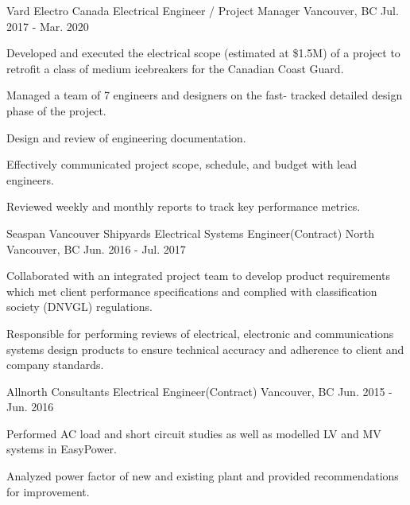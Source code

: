 \begin{cventries}
    \cventry
    {Vard Electro Canada} %
    {Electrical Engineer / Project Manager} %
    {Vancouver, BC} %
    {Jul. 2017 - Mar. 2020} %
    { %
        \begin{cvitems}
            \item {Developed and executed the electrical scope (estimated at \$1.5M) of a project to retrofit a class of medium icebreakers for the Canadian Coast Guard.}
            \item {Managed a team of 7 engineers and designers on the fast- tracked detailed design phase of the project.}
            \item {Design and review of engineering documentation.}
            \item {Effectively communicated project scope, schedule, and budget with lead engineers.}
            \item {Reviewed weekly and monthly reports to track key performance metrics.}
        \end{cvitems}
    }

    \cventry
    {Seaspan Vancouver Shipyards} %
    {Electrical Systems Engineer(Contract)} %
    {North Vancouver, BC} %
    {Jun. 2016 - Jul. 2017} %
    { %
        \begin{cvitems}
            \item {Collaborated with an integrated project team to develop product requirements which met client performance specifications and complied with classification society (DNVGL) regulations.}
            \item {Responsible for performing reviews of electrical, electronic and communications systems design products to ensure technical accuracy and adherence to client and company standards.}
        \end{cvitems}
    }

    \cventry
    {Allnorth Consultants} %
    {Electrical Engineer(Contract)} %
    {Vancouver, BC} %
    {Jun. 2015 - Jun. 2016} %
    { %
        \begin{cvitems}
            \item {Performed AC load and short circuit studies as well as modelled LV and MV systems in EasyPower.}
            \item{Analyzed power factor of new and existing plant and provided recommendations for improvement.}
        \end{cvitems}
    }


\end{cventries}
